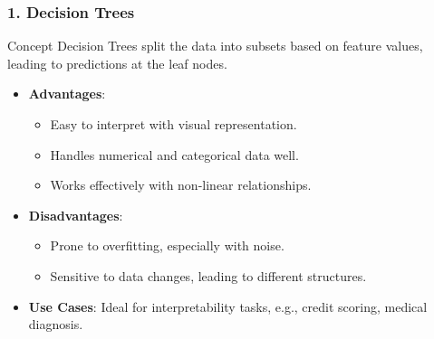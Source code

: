 \documentclass[aspectratio=169]{beamer}
\begin{document}
\begin{frame}[fragile]
    \frametitle{1. Decision Trees}
    \begin{block}{Concept}
        Decision Trees split the data into subsets based on feature values, leading to predictions at the leaf nodes.
    \end{block}
    \begin{itemize}
        \item \textbf{Advantages}:
            \begin{itemize}
                \item Easy to interpret with visual representation.
                \item Handles numerical and categorical data well.
                \item Works effectively with non-linear relationships.
            \end{itemize}
        \item \textbf{Disadvantages}:
            \begin{itemize}
                \item Prone to overfitting, especially with noise.
                \item Sensitive to data changes, leading to different structures.
            \end{itemize}
        \item \textbf{Use Cases}: Ideal for interpretability tasks, e.g., credit scoring, medical diagnosis.
    \end{itemize}
\end{frame}
\end{document}
